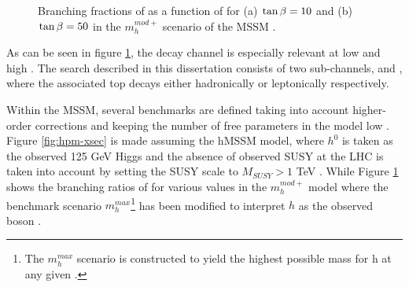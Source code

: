 	\begin{figure}[!ht]
		\centering
		\caption{\label{fig:hpm-br} Branching fractions of \Hpm as a function of \mHpm for (a) $\tan\beta = 10$ and (b) $\tan\beta = 50$ in the $m^{mod+}_{h}$ scenario of the \gls{MSSM} \cite{Higgs-Crosssections}. }
	\end{figure}
	As can be seen in figure \ref{fig:hpm-br}, the \HpmLong decay channel is especially relevant at low \mHpm and high \tanb. The search described in this dissertation consists of two sub-channels, \taujets and \taulep, where the associated top decays either hadronically or leptonically respectively. 

	Within the \gls{MSSM}, several benchmarks are defined taking into account higher-order corrections and keeping the number of free parameters in the model low \cite{MSSM-benchmarks}. Figure \ref{fig:hpm-xsec} is made assuming the hMSSM model, where $h^0$ is taken as the observed 125 GeV Higgs and the absence of observed \gls{SUSY} at the LHC is taken into account by setting the \gls{SUSY} scale to $M_{SUSY}>1$ TeV \cite{hMSSM}. While Figure \ref{fig:hpm-br} shows the branching ratios of \Hpm for various \tanb values in the $m^{mod+}_{h}$ model where the benchmark scenario $m^{max}_{h}$\footnote{The $m^{max}_{h}$ scenario is constructed to yield the highest possible mass for h at any given \tanb.} has been modified to interpret $h$ as the observed boson \cite{MSSM-benchmarks}.


